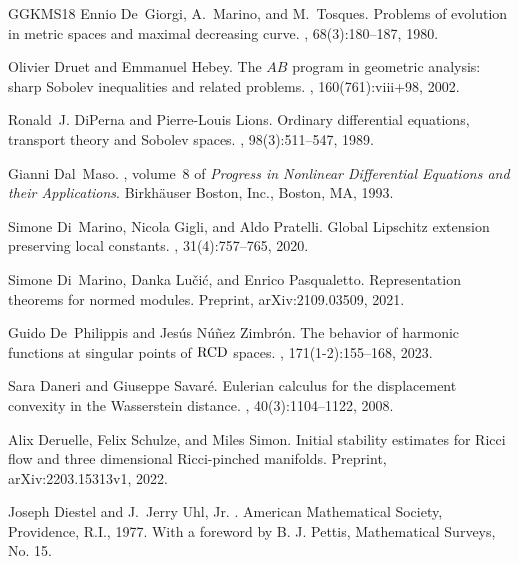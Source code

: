 \documentclass[11pt]{article}
\numberwithin{equation}{section}
\begin{document}
{\begin{thebibliography}{GGKMS18}
Ennio De~Giorgi, A.~Marino, and M.~Tosques.
\newblock Problems of evolution in metric spaces and maximal decreasing curve.
,
  68(3):180--187, 1980.

Olivier Druet and Emmanuel Hebey.
\newblock The {$AB$} program in geometric analysis: sharp {S}obolev
  inequalities and related problems.
, 160(761):viii+98, 2002.

Ronald~J. DiPerna and Pierre-Louis Lions.
\newblock Ordinary differential equations, transport theory and {S}obolev
  spaces.
, 98(3):511--547, 1989.

Gianni Dal~Maso.
, volume~8 of {\em
  Progress in Nonlinear Differential Equations and their Applications}.
\newblock Birkh\"{a}user Boston, Inc., Boston, MA, 1993.

Simone Di~Marino, Nicola Gigli, and Aldo Pratelli.
\newblock Global {L}ipschitz extension preserving local constants.
,
  31(4):757--765, 2020.

Simone Di~Marino, Danka Lu\v{c}i\'{c}, and Enrico Pasqualetto.
\newblock Representation theorems for normed modules.
\newblock Preprint, arXiv:2109.03509, 2021.

Guido De~Philippis and Jes\'{u}s N\'{u}\~{n}ez Zimbr\'{o}n.
\newblock The behavior of harmonic functions at singular points of {$\rm
  {RCD}$} spaces.
, 171(1-2):155--168, 2023.

Sara Daneri and Giuseppe Savar{\'e}.
\newblock Eulerian calculus for the displacement convexity in the {W}asserstein
  distance.
, 40(3):1104--1122, 2008.

Alix Deruelle, Felix Schulze, and Miles Simon.
\newblock Initial stability estimates for {R}icci flow and three dimensional
  {R}icci-pinched manifolds.
\newblock Preprint, arXiv:2203.15313v1, 2022.

Joseph Diestel and J.~Jerry Uhl, Jr.
.
\newblock American Mathematical Society, Providence, R.I., 1977.
\newblock With a foreword by B. J. Pettis, Mathematical Surveys, No. 15.


\end{thebibliography}}
\end{document}
